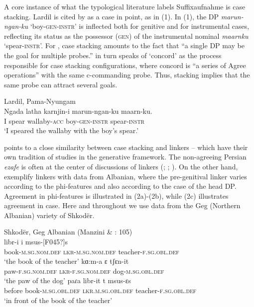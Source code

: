 \documentclass[output=paper]{langsci/langscibook}
\begin{document}
A core instance of what the typological literature labels Suffixaufnahme \citep{Plank1995} is case stacking. Lardil is cited by \citet{Richards2013} as a case in point, as in (1). In (1), the DP \textit{marun-ngan-ku} ‘boy-\textsc{gen-instr}’ is inflected both for genitive and for instrumental cases, reflecting its status as the possessor (\textsc{gen}) of the instrumental nominal \textit{maarnku} ‘spear-\textsc{instr}’. For \citet[62]{Merchant2006}, case stacking amounts to the fact that “a single DP may be the goal for multiple probes.” \citet{Richards2013} in turn speaks of ‘concord’ as the process responsible for case stacking configurations, where concord is “a series of Agree operations” with the same c-commanding probe. Thus, stacking implies that the same probe can attract several goals.

\ea%
Lardil, Pama-Nyungam \citep[43]{Richards2013}\\
\gll  Ngada latha   karnjin-i   marun-ngan-ku   maarn-ku.\\
I   spear   wallaby-\textsc{acc} boy-\textsc{gen-instr}  spear-\textsc{instr}\\
\glt ‘I speared the wallaby with the boy’s spear.’        
\z

\citet{Plank1995} points to a close similarity between case stacking and linkers – which have their own tradition of studies in the generative framework. The non-agreeing Persian \textit{ezafe} is often at the center of discussions of linkers (\citealt{Dikken2004}; \citealt{Larson2008}; \citealt{Richards2010}). On the other hand, \citet{Franco2015} exemplify linkers with data from Albanian, where the pre-genitival linker varies according to the phi-features and also according to the case of the head DP. Agreement in phi-features is illustrated in (2a)-(2b), while (2c) illustrates agreement in case. Here and throughout we use data from the Geg (Northern Albanian) variety of Shkodër.

\ea%
    Shkodër, Geg Albanian  (Manzini \& \citealt{Savoia2011b}: 105)\label{ex:manzini:2}\\
    \ea
    \gll libr-i          i       msus-[F045?]s   \\
            book-\textsc{m.sg.nom.def}  \textsc{lkr-m.sg.nom.def}   teacher-\textsc{f.sg.obl.def} \\
    \glt    ‘the book of the teacher’ 
    \gll kɑ:m-a      ɛ          tʃɛn-it                \\
         paw-\textsc{f.sg.nom.def}   \textsc{lkr-f.sg.nom.def}  dog-\textsc{m.sg.obl.def}  \\
    \glt ‘the paw of the dog’
    \gll paɾa     libr-it       t       msus-ɛs\\
         before   book-\textsc{m.sg.obl.def}  \textsc{lkr.m.sg.obl.def}  teacher-\textsc{f.sg.obl.def}\\
    \glt ‘in front of the book of the teacher’ 
    \z
\z 
\end{document}
